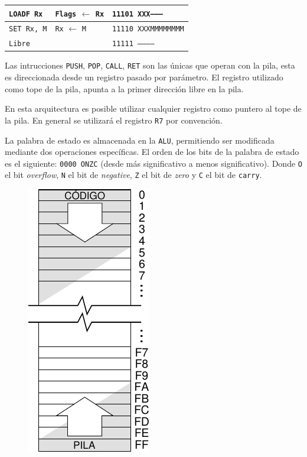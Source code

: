 \documentclass[a4paper,11pt]{article}
\begin{document}
\begin{center}
\begin{tabular}{l|l|l}
\texttt{LOADF Rx}      & \texttt{Flags} $\leftarrow$ \texttt{Rx}                            & \texttt{11101 XXX--------} \\  %
\hline
\texttt{SET Rx, M}     & \texttt{Rx} $\leftarrow$ \texttt{M}                                & \texttt{11110 XXXMMMMMMMM} \\  %
\hline
\texttt{Libre}         &                                                                    & \texttt{11111 -----------} \\  %
\end{tabular}
\end{center}

Las intrucciones \texttt{PUSH}, \texttt{POP}, \texttt{CALL}, \texttt{RET} son las únicas que operan con la pila, esta es direccionada desde un registro pasado por parámetro.
El registro utilizado como tope de la pila, apunta a la primer dirección libre en la pila.

En esta arquitectura es posible utilizar cualquier registro como puntero al tope de la pila. En general se utilizará el registro \texttt{R7} por convención.

La palabra de estado es almacenada en la \texttt{ALU}, permitiendo ser modificada mediante dos operaciones específicas.
El orden de los bits de la palabra de estado es el siguiente: \texttt{0000 ONZC} (desde más significativo a menos significativo).
Donde \texttt{O} el bit \emph{overflow}, \texttt{N} el bit de \emph{negative}, \texttt{Z} el bit de \emph{zero} y \texttt{C} el bit de \texttt{carry}. 

\begin{figure}
\begin{center}
\includegraphics[scale=0.7]{img/mapa_de_memoria.pdf}
\end{center}
\vspace{-1cm}
\end{figure}
\end{document}
